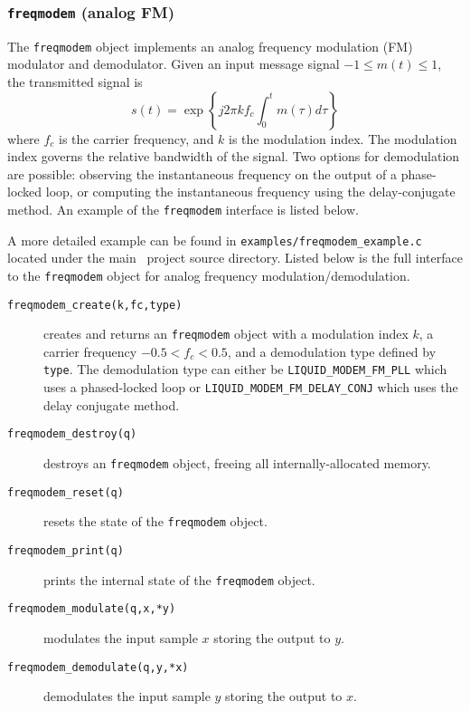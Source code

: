 \subsubsection{{\tt freqmodem} (analog FM)}
\label{module:modem:analog:freqmodem}
The {\tt freqmodem} object implements an analog frequency modulation
(FM) modulator and demodulator.
Given an input message signal $-1 \le m(t) \le 1$, the transmitted
signal is
%
\begin{equation}
\label{eqn:modem:freqmodem_tx}
    s(t) =  \exp\left\{
                j 2 \pi k f_c
                \int_{0}^{t}{
                    m(\tau)d\tau
                }
            \right\}
\end{equation}
%
where $f_c$ is the carrier frequency, and $k$ is the modulation index.
The modulation index governs the relative bandwidth of the signal.
Two options for demodulation are possible:
observing the instantaneous frequency on the output of a phase-locked
loop,
or computing the instantaneous frequency using the delay-conjugate
method.
%
An example of the {\tt freqmodem} interface is listed below.
%

%
A more detailed example can be found in
{\tt examples/freqmodem\_example.c}
located under the main \liquid\ project source directory.
Listed below is the full interface to the {\tt freqmodem} object for
analog frequency modulation/demodulation.
%
\begin{description}
\item[{\tt freqmodem\_create(k,fc,type)}]
    creates and returns an {\tt freqmodem} object with a modulation
    index $k$, a carrier frequency $-0.5 < f_c < 0.5$, and a
    demodulation type defined by {\tt type}.
    The demodulation type can either be
    {\tt LIQUID\_MODEM\_FM\_PLL} which uses a phased-locked loop or
    {\tt LIQUID\_MODEM\_FM\_DELAY\_CONJ} which uses the delay conjugate
    method.
\item[{\tt freqmodem\_destroy(q)}]
    destroys an {\tt freqmodem} object, freeing all internally-allocated
    memory.
\item[{\tt freqmodem\_reset(q)}]
    resets the state of the {\tt freqmodem} object.
\item[{\tt freqmodem\_print(q)}]
    prints the internal state of the {\tt freqmodem} object.
\item[{\tt freqmodem\_modulate(q,x,*y)}]
    modulates the input sample $x$ storing the output to $y$.
\item[{\tt freqmodem\_demodulate(q,y,*x)}]
    demodulates the input sample $y$ storing the output to $x$.
\end{description}

